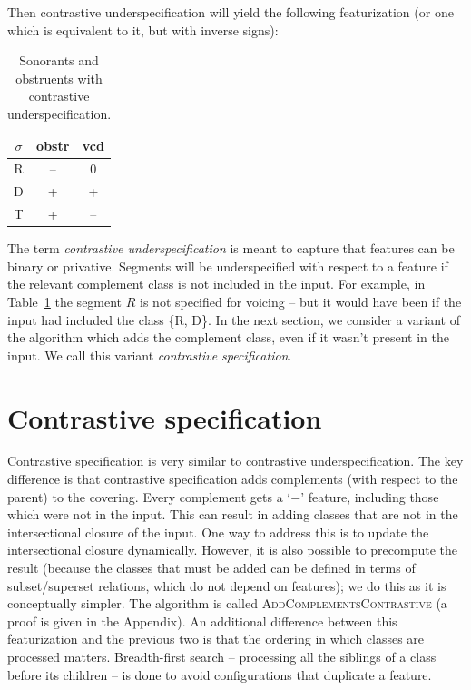 \documentclass[11pt, oneside]{article}   	%
\begin{document}
\noindent Then contrastive underspecification will yield the following featurization (or one which is equivalent to it, but with inverse signs):

\begin{table}[h]
    \centering
    \begin{tabular} {|c||c|c|}
    \hline
        $\sigma$ & obstr & vcd \\ \hline
        R & -- & 0 \\
        D & + & + \\
        T & + & -- \\
        \hline
    \end{tabular}
    \caption{Sonorants and obstruents with contrastive underspecification.}
    \label{table:underspecification}
\end{table}

The term \textit{contrastive underspecification} is meant to capture that features can be binary or privative. Segments will be underspecified with respect to a feature if the relevant complement class is not included in the input. For example, in Table~\ref{table:underspecification} the segment $R$ is not specified for voicing -- but it would have been if the input had included the class \{R, D\}. In the next section, we consider a variant of the algorithm which adds the complement class, even if it wasn't present in the input. We call this variant \textit{contrastive specification}.
    
\section{Contrastive specification}

Contrastive specification is very similar to contrastive underspecification. The key difference is that contrastive specification adds complements (with respect to the parent) to the covering. Every complement gets a `$-$' feature, including those which were not in the input. This can result in adding classes that are not in the intersectional closure of the input. One way to address this is to update the intersectional closure dynamically. However, it is also possible to precompute the result (because the classes that must be added can be defined in terms of subset/superset relations, which do not depend on features); we do this as it is conceptually simpler. The algorithm is called \textsc{AddComplementsContrastive} (a proof is given in the Appendix). An additional difference between this featurization and the previous two is that the ordering in which classes are processed matters. Breadth-first search -- processing all the siblings of a class before its children -- is done to avoid configurations that duplicate a feature.
\end{document}
